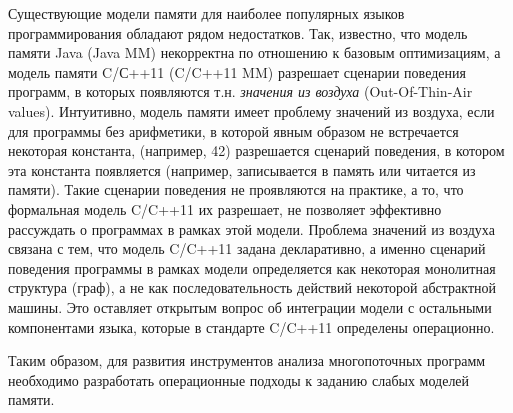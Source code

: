 

Существующие модели памяти для наиболее популярных языков программирования обладают рядом недостатков.
Так, известно, что модель памяти Java (Java MM) некорректна по отношению
к базовым оптимизациям, а модель памяти C/С++11 (C/C++11 MM) разрешает
сценарии поведения программ, в которых появляются т.н. \emph{значения из воздуха} (Out-Of-Thin-Air values).
Интуитивно, модель памяти имеет проблему значений из воздуха, если для программы без арифметики,
в которой явным образом не встречается некоторая константа, (например, 42) разрешается сценарий поведения,
в котором эта константа появляется (например, записывается в память или читается из памяти).
Такие сценарии поведения не проявляются на практике, а то,
что формальная модель C/C++11 их разрешает, не позволяет эффективно рассуждать о программах в рамках этой модели.
Проблема значений из воздуха связана с тем, что модель C/C++11 задана декларативно, а именно сценарий поведения программы
в рамках модели определяется как некоторая монолитная структура (граф), а не как последовательность действий некоторой
абстрактной машины.
Это оставляет открытым вопрос об интеграции модели с остальными компонентами языка, которые в стандарте C/C++11 определены
операционно.

Таким образом, для развития инструментов анализа многопоточных программ необходимо
разработать операционные подходы к заданию слабых моделей памяти.


